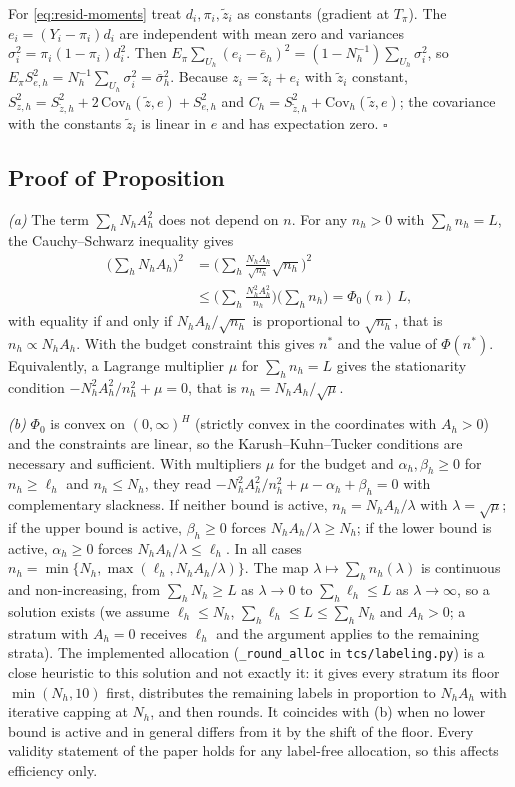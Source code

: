 For \eqref{eq:resid-moments} treat $d_i,\pi_i,\tilde z_i$ as constants (gradient at $T_\pi$). The $e_i=(Y_i-\pi_i)d_i$ are independent with mean zero and variances $\sigma_i^2=\pi_i(1-\pi_i)d_i^2$.
Then $E_\pi\sum_{U_h}(e_i-\bar e_h)^2=(1-N_h^{-1})\sum_{U_h}\sigma_i^2$, so $E_\pi S^2_{e,h}=N_h^{-1}\sum_{U_h}\sigma_i^2=\bar\sigma^2_h$. Because $z_i=\tilde z_i+e_i$ with $\tilde z_i$ constant,
$S^2_{z,h}=S^2_{\tilde z,h}+2\,\mathrm{Cov}_h(\tilde z,e)+S^2_{e,h}$ and $C_h=S^2_{\tilde z,h}+\mathrm{Cov}_h(\tilde z,e)$; the covariance with the constants $\tilde z_i$ is linear in $e$ and has expectation zero.
$\square$

\subsection{Proof of Proposition~}

\emph{(a)} The term $\sum_hN_hA_h^2$ does not depend on $n$. For any $n_h>0$ with $\sum_hn_h=L$, the
Cauchy--Schwarz inequality gives
\begin{align*}
\Big(\sum_hN_hA_h\Big)^2&=\Big(\sum_h\frac{N_hA_h}{\sqrt{n_h}}\sqrt{n_h}\Big)^2\\
&\le\Big(\sum_h\frac{N_h^2A_h^2}{n_h}\Big)\Big(\sum_hn_h\Big)=\Phi_0(n)\,L,
\end{align*}
with equality if and only if $N_hA_h/\sqrt{n_h}$ is proportional to $\sqrt{n_h}$, that is
$n_h\propto N_hA_h$. With the budget constraint this gives $n^\ast$ and the value of $\Phi(n^\ast)$.
Equivalently, a Lagrange multiplier $\mu$ for $\sum_hn_h=L$ gives the stationarity condition
$-N_h^2A_h^2/n_h^2+\mu=0$, that is $n_h=N_hA_h/\sqrt\mu$.

\emph{(b)} $\Phi_0$ is convex on $(0,\infty)^H$ (strictly convex in the coordinates with $A_h>0$)
and the constraints are linear, so the Karush--Kuhn--Tucker conditions are necessary and sufficient.
With multipliers $\mu$ for the budget and $\alpha_h,\beta_h\ge0$ for $n_h\ge\ell_h$ and
$n_h\le N_h$, they read $-N_h^2A_h^2/n_h^2+\mu-\alpha_h+\beta_h=0$ with complementary slackness. If
neither bound is active, $n_h=N_hA_h/\lambda$ with $\lambda=\sqrt\mu$; if the upper bound is active,
$\beta_h\ge0$ forces $N_hA_h/\lambda\ge N_h$; if the lower bound is active, $\alpha_h\ge0$ forces
$N_hA_h/\lambda\le\ell_h$. In all cases $n_h=\min\{N_h,\max(\ell_h,N_hA_h/\lambda)\}$. The map
$\lambda\mapsto\sum_hn_h(\lambda)$ is continuous and non-increasing, from $\sum_hN_h\ge L$ as
$\lambda\to0$ to $\sum_h\ell_h\le L$ as $\lambda\to\infty$, so a solution exists (we assume $\ell_h\le N_h$, $\sum_h\ell_h\le L\le\sum_hN_h$ and $A_h>0$; a stratum with $A_h=0$ receives
$\ell_h$ and the argument applies to the remaining strata). The implemented allocation (\texttt{\_round\_alloc} in \texttt{tcs/labeling.py}) is a close heuristic to this solution and not exactly it: it
gives every stratum its floor $\min(N_h,10)$ first, distributes the remaining labels in proportion to $N_hA_h$ with iterative capping at $N_h$, and then rounds. It
coincides with (b) when no lower bound is active and in general differs from it by the shift of the floor. Every validity statement of the paper holds for any label-free allocation, so this affects efficiency only.

